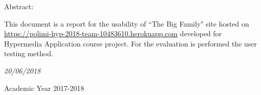 \documentclass[a4paper,12pt,twoside]{report}
\begin{document}
\begin{center}
\begin{center}
\vspace{10mm}
Abstract:
\vspace{-4mm}
\end{center}
\end{center}
\large{This document is a report for the usability of ``The Big Family" site hosted on \href{https://polimi-hyp-2018-team-10483610.herokuapp.com}{https://polimi-hyp-2018-team-10483610.herokuapp.com} developed for Hypermedia Application course project. For the evaluation is performed the user testing method.}
\vspace{10mm}


\begin{center}
\vspace{-4mm}
\it{\large{20/06/2018}}
\end{center}
\begin{center}
\vspace{-4mm}
{\large{Academic Year 2017-2018}}
\end{center}

\end{document}
